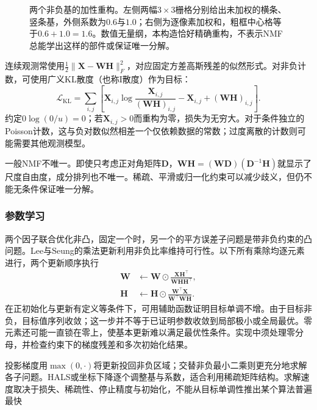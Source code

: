 \begin{figure}[htbp]
  \centering
  
  \caption{两个非负基的加性重构。左侧两幅$3\times3$栅格分别给出未加权的横条、竖条基，外侧系数为$0.6$与$1.0$；右侧为逐像素加权和，粗框中心格等于$0.6+1.0=1.6$。数值无量纲，本构造恰好精确重构，不表示NMF总能学出这样的部件或保证唯一分解。}
  \label{fig:dim-nmf-parts}
\end{figure}

连续观测常使用$\frac12\lVert\bm{X}-\bm{W}\bm{H}\rVert_F^2$，对应固定方差高斯残差的似然形式。对非负计数，可使用广义KL散度（也称I散度）作为目标：
\begin{equation}
  \mathcal{L}_{\mathrm{KL}}
  =\sum_{i,j}\left[
      \bm{X}_{i,j}\log\frac{\bm{X}_{i,j}}{(\bm{W}\bm{H})_{i,j}}
      -\bm{X}_{i,j}+(\bm{W}\bm{H})_{i,j}\right].
  \label{eq:dim-nmf-kl}
\end{equation}
约定$0\log(0/u)=0$；若$\bm{X}_{i,j}>0$而重构为零，损失为无穷大。对于条件独立的Poisson计数，这与负对数似然相差一个仅依赖数据的常数；过度离散的计数则可能需要其他观测模型。

一般NMF不唯一。即使只考虑正对角矩阵$\bm{D}$，$\bm{W}\bm{H}=(\bm{W}\bm{D})(\bm{D}^{-1}\bm{H})$就显示了尺度自由度，成分排列也不唯一。稀疏、平滑或归一化约束可以减少歧义，但仍不能无条件保证唯一分解。

\subsubsection{参数学习}
\label{sec:dim-nmf-learning}

两个因子联合优化非凸，固定一个时，另一个的平方误差子问题是带非负约束的凸问题。Lee与Seung的乘法更新利用非负比率维持可行性。以下所有乘除均逐元素进行，两个更新顺序执行
\begin{equation}
  \begin{aligned}
    \bm{W}&\leftarrow\bm{W}\odot
       \frac{\bm{X}\bm{H}^{\top}}
        {\bm{W}\bm{H}\bm{H}^{\top}},\\
    \bm{H}&\leftarrow\bm{H}\odot
       \frac{\bm{W}^{\top}\bm{X}}
        {\bm{W}^{\top}\bm{W}\bm{H}}.
  \end{aligned}
  \label{eq:dim-nmf-mu}
\end{equation}
在正初始化与更新有定义等条件下，可用辅助函数证明目标单调不增。由于目标非负，目标值序列收敛；这一步并不等于已证明参数收敛到局部极小或全局最优。零元素还可能一直锁在零上，使基本更新难以满足最优性条件。实现中须处理零分母，并检查约束下的梯度残差和多次初始化结果。

投影梯度用$\max(0,\cdot)$将更新投回非负区域；交替非负最小二乘则更充分地求解各子问题。HALS或坐标下降逐个调整基与系数，适合利用稀疏矩阵结构。求解速度取决于损失、稀疏性、停止精度与初始化，不能从目标单调性推出某个算法普遍最快

